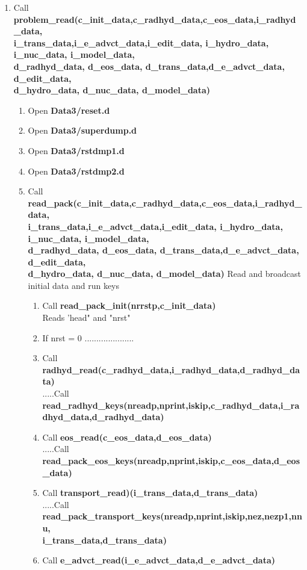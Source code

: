 \documentclass[11pt,doublespace]{article}
\begin{document}
\begin{itemize}
\begin{enumerate}
\begin{enumerate}
  \item Call {\bf problem\_read(c\_init\_data,c\_radhyd\_data,c\_eos\_data,i\_radhyd\_data,\\
i\_trans\_data,i\_e\_advct\_data,i\_edit\_data, i\_hydro\_data, i\_nuc\_data, i\_model\_data,\\
d\_radhyd\_data, d\_eos\_data, d\_trans\_data,d\_e\_advct\_data, d\_edit\_data,\\
d\_hydro\_data, d\_nuc\_data, d\_model\_data)}
\begin{enumerate}
  \item Open {\bf Data3/reset.d}
  \item Open {\bf Data3/superdump.d}
  \item Open {\bf Data3/rstdmp1.d}
  \item Open {\bf Data3/rstdmp2.d}
  \item Call {\bf read\_pack(c\_init\_data,c\_radhyd\_data,c\_eos\_data,i\_radhyd\_data,\\
i\_trans\_data,i\_e\_advct\_data,i\_edit\_data, i\_hydro\_data, i\_nuc\_data, i\_model\_data,\\
d\_radhyd\_data, d\_eos\_data, d\_trans\_data,d\_e\_advct\_data, d\_edit\_data,\\
d\_hydro\_data, d\_nuc\_data, d\_model\_data)} Read and broadcast initial data and run keys
\begin{enumerate}
  \item Call {\bf read\_pack\_init(nrrstp,c\_init\_data)}\\
  Reads 'head" and "nrst"
  \item If nrst = 0 .....................
  \item Call {\bf radhyd\_read(c\_radhyd\_data,i\_radhyd\_data,d\_radhyd\_data)}\\
  .....Call {\bf read\_radhyd\_keys(nreadp,nprint,iskip,c\_radhyd\_data,i\_radhyd\_data,d\_radhyd\_data)}
  \item Call {\bf eos\_read(c\_eos\_data,d\_eos\_data)}\\
   .....Call {\bf read\_pack\_eos\_keys(nreadp,nprint,iskip,c\_eos\_data,d\_eos\_data)}
  \item Call {\bf transport\_read)(i\_trans\_data,d\_trans\_data)}\\
   .....Call {\bf read\_pack\_transport\_keys(nreadp,nprint,iskip,nez,nezp1,nnu,\\
   i\_trans\_data,d\_trans\_data)}
  \item Call {\bf e\_advct\_read(i\_e\_advct\_data,d\_e\_advct\_data)}\\

\end{enumerate}
\end{enumerate}
\end{enumerate}
\end{enumerate}
\end{itemize}
\end{document}
